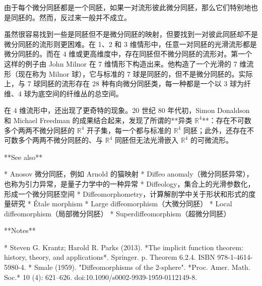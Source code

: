 由于每个微分同胚都是一个同胚，如果一对流形彼此微分同胚，那么它们特别地也是同胚的。然而，反过来一般并不成立。

虽然很容易找到一些是同胚但不是微分同胚的映射，但要找到一对彼此同胚却不是微分同胚的流形则更困难。在 1、2 和 3 维情形中，任意一对同胚的光滑流形都是微分同胚的。而在 4 维或更高维度中，存在同胚但不微分同胚的流形对。第一个这样的例子由 John Milnor 在 7 维情形下构造出来。他构造了一个光滑的 7 维流形（现在称为 Milnor 球），它与标准的 7 球是同胚的，但不是微分同胚的。实际上，与 7 球同胚的流形存在 28 种有向微分同胚类，每一种都是一个以 3 球为纤维、4 球为底空间的纤维丛的总空间。

在 4 维流形中，还出现了更奇特的现象。20 世纪 80 年代初，Simon Donaldson 和 Michael Freedman 的成果结合起来，发现了所谓的**异类 $\mathbb{R}^4$**：存在不可数多个两两不微分同胚的 $\mathbb{R}^4$ 开子集，每一个都与标准的 $\mathbb{R}^4$ 同胚；此外，还存在不可数多个两两不微分同胚的、与 $\mathbb{R}^4$ 同胚但无法光滑嵌入 $\mathbb{R}^4$ 的可微流形。

**See also**

* Anosov 微分同胚，例如 Arnold 的猫映射
* Diffeo anomaly（微分同胚异常），也称为引力异常，是量子力学中的一种异常
* Diffeology，集合上的光滑参数化，形成一个微分同胚空间
* Diffeomorphometry，计算解剖学中关于形状和形式的度量研究
* Étale morphism
* Large diffeomorphism（大微分同胚）
* Local diffeomorphism（局部微分同胚）
* Superdiffeomorphism（超微分同胚）

**Notes**

* Steven G. Krantz; Harold R. Parks (2013). *The implicit function theorem: history, theory, and applications*. Springer. p. Theorem 6.2.4. ISBN 978-1-4614-5980-4.
* Smale (1959). "Diffeomorphisms of the 2-sphere". *Proc. Amer. Math. Soc.* 10 (4): 621–626. doi:10.1090/s0002-9939-1959-0112149-8.
